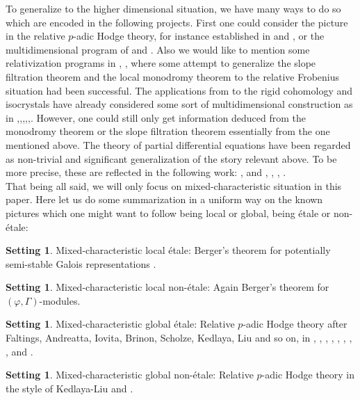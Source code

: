 \documentclass[12pt]{amsart}
\theoremstyle{definition}
\numberwithin{equation}{section}
\newtheorem{setting}[theorem]{Setting}
\begin{document}
\indent To generalize to the higher dimensional situation, we have many ways to do so which are encoded in the following projects. First one could consider the picture in the relative $p$-adic Hodge theory, for instance established in \cite{KL1} and \cite{KL2}, or the multidimensional program of \cite{CKZ18} and \cite{PZ19}. Also we would like to mention some relativization programs in \cite{BC1}, \cite{Ked2}, \cite{Liu1} where some attempt to generalize the slope filtration theorem and the local monodromy theorem to the relative Frobenius situation had been successful. The applications from \cite{Ked1} to the rigid cohomology and isocrystals have already considered some sort of multidimensional construction as in \cite{Ked3},\cite{Ked4},\cite{Ked5},\cite{Ked6},\cite{Ked7},\cite{Ked8}. However, one could still only get information deduced from the monodromy theorem or the slope filtration theorem essentially from the one mentioned above. The theory of partial differential equations have been regarded as non-trivial and significant generalization of the story relevant above. To be more precise, these are reflected in the following work: \cite{Xiao1}, \cite{Xiao2} and \cite{KX1}, \cite{Ked10}, \cite{Ked11}, \cite{Ked12}.\\


\indent That being all said, we will only focus on mixed-characteristic situation in this paper. Here let us do some summarization in a uniform way on the known pictures which one might want to follow being local or global, being \'etale or non-\'etale:



\begin{setting}
Mixed-characteristic local \'etale: Berger's theorem for potentially semi-stable Galois representations \cite{Ber1}.	
\end{setting}

\begin{setting}
Mixed-characteristic local non-\'etale: Again Berger's theorem for $(\varphi,\Gamma)$-modules.
\end{setting}

\begin{setting}
Mixed-characteristic global \'etale: Relative $p$-adic Hodge theory after Faltings, Andreatta, Iovita, Brinon, Scholze, Kedlaya, Liu and so on, in \cite{Fal}, \cite{A1}, \cite{AI1}, \cite{AI2}, \cite{AB1}, \cite{AB2}, \cite{AB3}, \cite{Sch1}, \cite{KL1} and \cite{KL2}.
\end{setting}

\begin{setting}
Mixed-characteristic global non-\'etale: Relative $p$-adic Hodge theory in the style of Kedlaya-Liu \cite{KL1} and \cite{KL2}.	
\end{setting}
\end{document}
